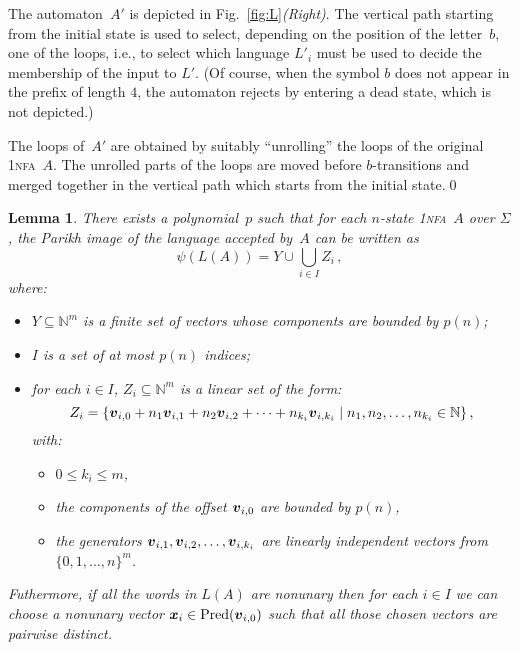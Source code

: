 \documentclass[11pt]{article}
\newcommand*{\ow}{\textsc{1}}
\newcommand*{\ownfa}{\ow\textsc{nfa}}
\newcommand{\Pred}{\ensuremath{\mathrm{Pred}}}
\def\Vec#1{\mbox{\boldmath $#1$}}
\newtheorem{lemma}[theorem]{Lemma}
\newenvironment{example}{\begin{ex}\rm}{\end{ex}}
\begin{document}
\begin{example}
The automaton~$A'$ is depicted in Fig.~\ref{fig:L}\emph{(Right)}. The vertical path starting from the initial
state is used to select, depending on the position of the letter~$b$, one of the loops, i.e., to select which
language $L'_i$ must be used to decide the membership of the input to $L'$. (Of course, when the symbol $b$ does not
appear in the prefix of length $4$, the automaton rejects by entering a dead state, which is not depicted.)

The loops of~$A'$ are obtained by suitably ``unrolling'' the loops of the original \ownfa~$A$. The unrolled
parts of the loops are moved before $b$-transitions and merged together in the vertical path which starts from the
initial state.\qed
\end{example}


\begin{lemma}\label{lem:representation}
  There exists a polynomial~$p$ such that for each $n$-state \ownfa\  $A$ over $\Sigma$,
  the Parikh image of the language accepted by~$A$ can be written as
	\begin{equation}\label{eq:nf}
	\psi(L(A)) = Y\cup\bigcup_{i \in I} Z_i\,,
	\end{equation}
	where:
	\begin{itemize}
	\item $Y\subseteq\mathbb{N}^m$ is a finite set of vectors whose components are bounded by $p(n)$;
	\item $I$ is a set of at most $p(n)$ indices;
	\item for each $i\in I$, $Z_i \subseteq \mathbb{N}^m$ is a linear set of the form: 
	\begin{equation}\label{eq:Zi}
		Z_i = \{\Vec{v}_{i, 0} + n_1 \Vec{v}_{i, 1} + n_2 \Vec{v}_{i, 2} + \cdots + n_{k_i} \Vec{v}_{i, k_i}\mid n_1,n_2, \ldots, n_{k_i} \in \mathbb{N}\}\,,
	\end{equation}
	with:
	\begin{itemize}
	\item $0\le k_i\le m$,
	\item the components of the offset $\Vec{v}_{i, 0}$ are bounded by $p(n)$, 
	\item the generators $\Vec{v}_{i, 1},\Vec{v}_{i, 2}, \ldots, \Vec{v}_{i, k_i}$ are linearly independent 
	vectors from $\{0, 1, \ldots, n\}^m$.
	\end{itemize}
	\end{itemize}
	Futhermore, if all the words in $L(A)$ are nonunary then
	for each $i \in I$ we can choose a {\it nonunary} vector $\Vec{x}_i \in \Pred(\Vec{v}_{i, 0})$ such that all
	those chosen vectors are pairwise distinct. 
\end{lemma}
\end{document}
